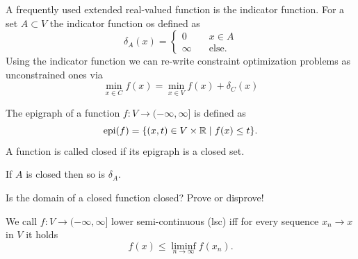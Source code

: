 \begin{example}
    A frequently used extended real-valued function is the indicator function. For a set $A\subset V$ the indicator function os defined as 
    \begin{equation}
        \delta_A(x) = 
        \begin{cases}
            0\quad &x\in A\\
            \infty\quad &\text{else.}
        \end{cases}
    \end{equation}
    Using the indicator function we can re-write constraint optimization problems as unconstrained ones via
    \begin{equation}
        \min_{x\in C} f(x) = \min_{x\in V} f(x)+\delta_C(x)
    \end{equation}
\end{example}

\begin{defn}
    The epigraph of a function $f:V\rightarrow (-\infty,\infty]$ is defined as 
    \begin{equation}
        \operatorname{\mathrm{epi}}(f) = \{ (x,t)\in V\times \mathbb{R}\; |\; f(x)\leq t\}.
    \end{equation}
    A function is called closed if its epigraph is a closed set.
\end{defn}

\begin{exercise}
    If $A$ is closed then so is $\delta_A$.
\end{exercise}

\begin{exercise}
    Is the domain of a closed function closed? Prove or disprove!
\end{exercise}


\begin{defn}
    We call $f:V\rightarrow(-\infty,\infty]$ lower semi-continuous (lsc) iff for every sequence $x_n\rightarrow x$ in $V$ it holds
    \begin{equation}
        f(x)\leq \liminf_{n\rightarrow \infty}f(x_n).
    \end{equation}
\end{defn}

